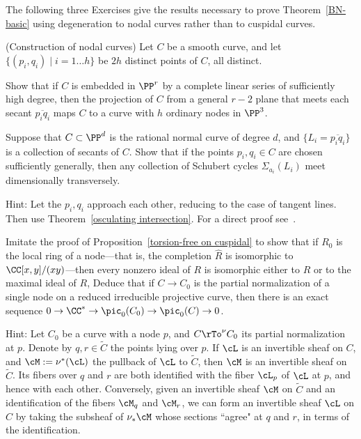 The following three Exercises give the results necessary to prove Theorem~\ref{BN-basic} using degeneration to
nodal curves rather than to cuspidal curves. 

\begin{exercise}\label{independent secants}\label{Constructing nodal curves} (Construction of nodal curves) Let $C$ be a smooth curve,
and let
 $\{(p_{i}, q_{i}) \mid i = 1\dots h\}$ be $2h$ distinct points of $C$, all distinct. 
 
Show that if $C$ is embedded in $\PP^{r}$ by a complete linear series of sufficiently high degree, then the
projection of $C$ from a general $r-2$ plane that meets each secant $\overline{p_{i}q_{i}}$
maps $C$ to a curve with $h$ ordinary nodes in $\PP^{3}$.
\end{exercise}

\begin{exercise}\label{BN via nodal curves}\label{secant general position}
Suppose that $C\subset \PP^{d}$ is the rational normal curve of degree $d$, and $\{L_{i} = \overline{p_{i}q_{i}}\}$
is a collection of secants of $C$. Show that if the points $p_{i}, q_{i}\in C$ are chosen sufficiently generally,
then any collection of Schubert cycles $\Sigma_{a_{i}}(L_{i})$ meet dimensionally transversely.

Hint: Let the $p_{i}, q_{i}$ approach each other, reducing to the case of tangent lines. Then use
Theorem~\ref{osculating intersection}. For a direct proof see~\cite[Lemma, p. 259]{Griffiths-Harris-BN}.
\end{exercise}

\begin{exercise}\label{linear series on a nodal curve}
Imitate the proof of Proposition~\ref{torsion-free on cuspidal} to show that if $R_{0}$ is the local ring of a node---that is, the completion $\widehat R$ is isomorphic to $\CC[x,y]/(xy)$---then every nonzero ideal of $R$ is isomorphic
either to $R$ or to the maximal ideal of $R$, Deduce that if $C\to C_{0}$ is the
partial normalization of a single node on a reduced irreducible projective curve, then there is an exact sequence
$0\to \CC^{*} \to \pic_{0}(C_{0}) \to \pic_{0}(C) \to 0$.

Hint:
Let $C_{0}$ be a curve with a node $p$, and $C \rTo^\nu C_{0}$ its partial normalization at $p$. Denote by $q,r \in \widetilde C$ the points lying over $p$. If $\cL$ is an invertible sheaf on $C$, and $\cM := \nu^*(\cL)$ the pullback of $\cL$ to $\widetilde C$, then $\cM$ is an invertible sheaf on $\widetilde C$. Its fibers over $q$ and $r$ are both identified with the fiber $\cL_p$ of $\cL$ at $p$, and hence with each other. Conversely, given an invertible sheaf $\cM$ on $\widetilde C$ and an identification of the fibers $\cM_q$ and $\cM_r$, we can form an invertible sheaf $\cL$ on $C$ by taking the subsheaf of $\nu_*\cM$ whose sections ``agree" at $q$ and $r$, in terms of the identification. 
\end{exercise}
 
